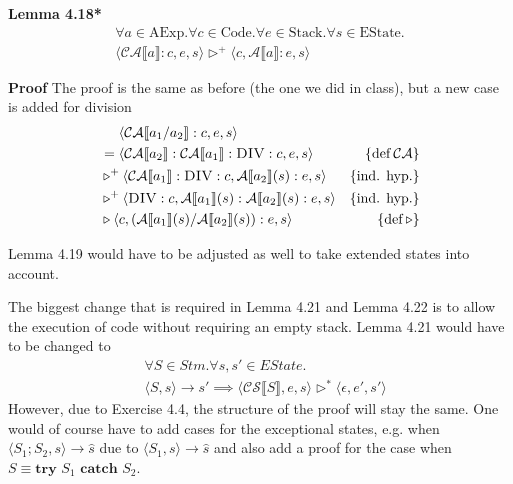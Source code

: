 \documentclass[11pt,oneside,a4paper]{article}
\newcommand{\SExp}[2]{\mathcal{#1}\llbracket #2 \rrbracket}
\newcommand{\AMConf}[3]{\langle #1, #2, #3 \rangle}
\newcommand{\NSConf}[2]{\langle #1, #2 \rangle}
\newcommand{\NSProd}[3]{\NSConf{#1}{#2} \rightarrow #3}
\begin{document}
{\bf Lemma 4.18*} 
\begin{align*}
\forall a \in \text{AExp}.\forall c \in \text{Code}.\forall e \in \text{Stack}.
\forall s \in \text{EState}. \\
\langle\mathcal{CA}\llbracket a \rrbracket:c, e, s \rangle \triangleright^+ 
\langle c, \mathcal{A}\llbracket a \rrbracket:e, s \rangle
\end{align*}

{\bf Proof}
The proof is the same as before (the one we did in class), 
but a new case is added for division
\begin{align*}
[a \equiv a_1 / a_2]&\:\:\:\:\:\: \langle \mathcal{CA}\llbracket a_1 / a_2 
\rrbracket:c,
e, s \rangle \\
&= \langle \mathcal{CA}\llbracket a_2 \rrbracket:\mathcal{CA} \llbracket a_1
\rrbracket:\textsc{DIV}:c, e, s\rangle & \{\text{def}\:\mathcal{CA}\} \\
&\triangleright^+ \langle \mathcal{CA} \llbracket a_1 \rrbracket:\textsc{DIV}:c,
\mathcal{A}\llbracket a_2 \rrbracket(s):e, s \rangle & \{\text{ind. hyp.}\} \\
&\triangleright^+ \langle \textsc{DIV}:c,
\mathcal{A}\llbracket a_1 \rrbracket(s):\mathcal{A}\llbracket a_2 
\rrbracket(s):e, 
s \rangle & \{\text{ind. hyp.}\} \\
&\triangleright \langle c, (\mathcal{A}\llbracket a_1 \rrbracket(s) /
\mathcal{A}\llbracket a_2 \rrbracket(s)):e, s \rangle & \{\text{def}\: 
\triangleright\} \\
\end{align*}

Lemma 4.19 would have to be adjusted as well to take extended states into
account.

The biggest change that is required in Lemma 4.21 and Lemma 4.22 is to allow
the execution of code without requiring an empty stack. Lemma 4.21 would
have to be changed to
\begin{align*}
&\forall S \in Stm.\forall s, s' \in EState. \\
&\NSProd{S}{s}{s'} \implies \AMConf{\SExp{CS}{S}}{e}{s}
\triangleright^{*} \AMConf{\epsilon}{e'}{s'}
\end{align*}
However, due to Exercise 4.4, the structure of the proof will stay the same.
One would of course have to add cases for the exceptional states, e.g. when 
\(\NSProd{S_1;S_2}{s}{\hat{s}}\) due to \(\NSProd{S_1}{s}{\hat{s}}\) and also 
add a proof for the case when \(S \equiv \textbf{try } S_1 \textbf{ catch }
S_2\).
\end{document}
